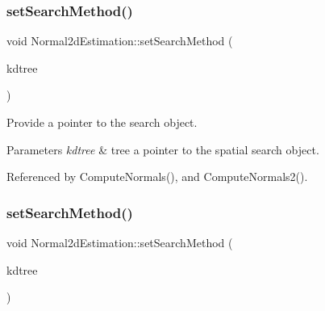 \subsubsection{\texorpdfstring{set\+Search\+Method()}{setSearchMethod()}\hspace{0.1cm}{\footnotesize\ttfamily [1/2]}}
{\footnotesize\ttfamily void Normal2d\+Estimation\+::set\+Search\+Method (\begin{DoxyParamCaption}\item[{const \hyperlink{Normal2dEstimation_8h_a8b809d6f98757c822d529e8f675940cd}{Ptrkd\+Tree} \&}]{kdtree }\end{DoxyParamCaption})\hspace{0.3cm}{\ttfamily [inline]}}



Provide a pointer to the search object. 


\begin{DoxyParams}{Parameters}
{\em kdtree} & tree a pointer to the spatial search object. \\
\hline
\end{DoxyParams}


Referenced by Compute\+Normals(), and Compute\+Normals2().

\mbox{\label{classNormal2dEstimation_a87261649c17ea4f561da89066591a900}} 
\subsubsection{\texorpdfstring{set\+Search\+Method()}{setSearchMethod()}\hspace{0.1cm}{\footnotesize\ttfamily [2/2]}}
{\footnotesize\ttfamily void Normal2d\+Estimation\+::set\+Search\+Method (\begin{DoxyParamCaption}\item[{const \hyperlink{Normal2dEstimation_8h_a8b809d6f98757c822d529e8f675940cd}{Ptrkd\+Tree} \&}]{kdtree }\end{DoxyParamCaption})\hspace{0.3cm}{\ttfamily [inline]}}

\mbox{\label{classNormal2dEstimation_ad05b65f35c4aa0b1511bf81e5a70b36d}} 

